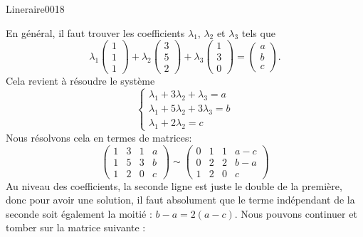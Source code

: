 \begin{corrige}{Lineraire0018}

	En général, il faut trouver les coefficients $\lambda_1$, $\lambda_2$ et $\lambda_3$ tels que
	\begin{equation}
		\lambda_1\begin{pmatrix}
			1	\\ 
			1	\\ 
			1	
		\end{pmatrix}+
		\lambda_2\begin{pmatrix}
			3	\\ 
			5	\\ 
			2	
		\end{pmatrix}+
		\lambda_3\begin{pmatrix}
			1	\\ 
			3	\\ 
			0	
		\end{pmatrix}
		=
		\begin{pmatrix}
			a	\\ 
			b	\\ 
			c	
		\end{pmatrix}.
	\end{equation}
	Cela revient à résoudre le système
	\begin{equation}
		\left\{
		\begin{array}{ll}
			\lambda_1+3\lambda_2+\lambda_3=a\\
			\lambda_1+5\lambda_2+3\lambda_3=b\\
			\lambda_1+2\lambda_2=c
		\end{array}
		\right.
	\end{equation}
	Nous résolvons cela en termes de matrices:
	\begin{equation}
		\left(\begin{array}{ccc|c}
			 1	&	3	&	1	&	a	\\
			  1	&	5	&	3	&	b\\
			   1	&	2	&	0	&	c	 
		   \end{array}\right)
		   \sim
		   \left(\begin{array}{ccc|c}
			    0	&	1	&	1	&	a-c	\\
			     0	&	2	&	2	&	b-a\\
			      1	&	2	&	0	&	c	 
		      \end{array}\right)
	\end{equation}
	Au niveau des coefficients, la seconde ligne est juste le double de la première, donc pour avoir une solution, il faut absolument que le terme indépendant de la seconde soit également la moitié : $b-a=2(a-c)$. Nous pouvons continuer et tomber sur la matrice suivante :

\end{corrige}
